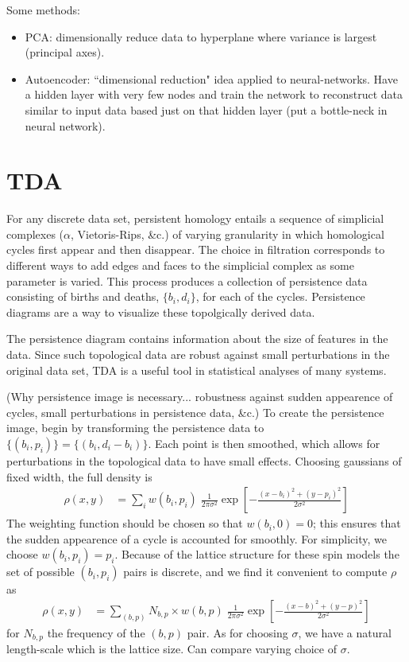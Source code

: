 \documentclass[11pt]{article}
\begin{document}
Some methods:
\begin{itemize}
    \item PCA: dimensionally reduce data to hyperplane where variance is largest (principal axes).
    \item Autoencoder: ``dimensional reduction" idea applied to neural-networks. Have a hidden layer with very few nodes and train the network to reconstruct data similar to input data based just on that hidden layer (put a bottle-neck in neural network).
\end{itemize}


\section{TDA}
For any discrete data set, persistent homology entails a sequence of simplicial complexes ($\alpha$, Vietoris-Rips, \&c.) of varying granularity in which homological cycles first appear and then disappear. The choice in filtration corresponds to different ways to add edges and faces to the simplicial complex as some parameter is varied. This process produces a collection of persistence data consisting of births and deaths, $\{b_i,d_i\}$, for each of the cycles. Persistence diagrams are a way to visualize these topolgically derived data.

The persistence diagram contains information about the size of features in the data. Since such topological data are robust against small perturbations in the original data set, TDA is a useful tool in statistical analyses of many systems.


(Why persistence image is necessary... robustness against sudden appearence of cycles, small perturbations in persistence data, \&c.) To create the persistence image, begin by transforming the persistence data to $\{(b_i,p_i)\}=\{(b_i,d_i-b_i)\}$. Each point is then smoothed, which allows for perturbations in the topological data to have small effects. Choosing gaussians of fixed width, the full density is
\begin{align}
    \rho(x,y) &= \sum_i w(b_i,p_i)\;\frac{1}{2\pi\sigma^2}\exp\left[-\frac{(x-b_i)^2+(y-p_i)^2}{2\sigma^2}\right]
\end{align}
The weighting function should be chosen so that $w(b_i,0)=0$; this ensures that the sudden appearence of a cycle is accounted for smoothly. For simplicity, we choose $w(b_i,p_i)=p_i$. Because of the lattice structure for these spin models the set of possible $(b_i,p_i)$ pairs is discrete, and we find it convenient to compute $\rho$ as
\begin{align}
    \rho(x,y) &= \sum_{(b,p)}N_{b,p}\times w(b,p)\;\frac{1}{2\pi\sigma^2}\exp\left[-\frac{(x-b)^2+(y-p)^2}{2\sigma^2}\right]
\end{align}
for $N_{b,p}$ the frequency of the $(b,p)$ pair. As for choosing $\sigma$, we have a natural length-scale which is the lattice size. Can compare varying choice of $\sigma$.
\end{document}
